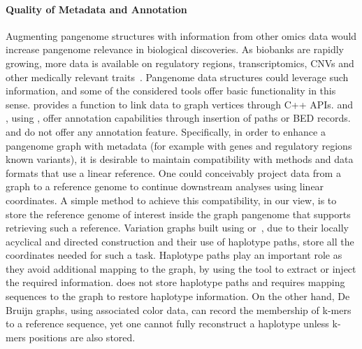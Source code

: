\paragraph{\textbf{\textup{Quality of Metadata and Annotation}}}
Augmenting pangenome structures with information from other omics data would increase pangenome relevance in biological discoveries. As biobanks are rapidly growing, more data is available on regulatory regions, transcriptomics, CNVs and other medically relevant traits~\cite{100000genomes,ucla}. Pangenome data structures could leverage such information, and some of the considered tools offer basic functionality in this sense.
\bifrost provides a function to link data to graph vertices through C++ APIs. \pggb and \mcactus, using \odgi, offer annotation capabilities through insertion of paths or BED records. \minigraph and \mdbg do not offer any annotation feature. 
Specifically, in order to enhance a pangenome graph with metadata (for example with genes and regulatory regions known variants), it is desirable to maintain compatibility with methods and data formats that use a linear reference. One could conceivably project data from a graph to a reference genome to continue downstream analyses using linear coordinates. A simple method to achieve this compatibility, in our view, is to store the reference genome of interest inside the graph pangenome that supports retrieving such a reference. Variation graphs built using \mbox{\pggb or \mcactus}, due to their locally acyclical and directed construction and their use of haplotype paths, store all the coordinates needed for such a task. Haplotype paths play an important role as they avoid additional mapping to the graph, by using the \mbox{\odgi}tool to extract or inject the required information. \mbox{\minigraph} does not store haplotype paths and requires mapping sequences to the graph to restore haplotype information. On the other hand, De Bruijn graphs, using associated color data, can record the membership of k-mers to a reference sequence, yet one cannot fully reconstruct a haplotype unless k-mers positions are also stored.
